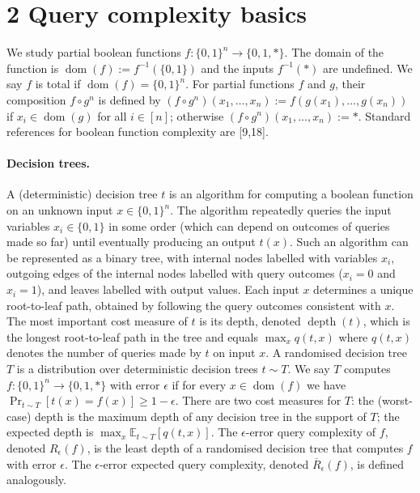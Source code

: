 \documentclass[10pt,a4paper]{article}
\begin{document}
\section*{2 Query complexity basics}
We study partial boolean functions $f:\{0,1\}^n\to\{0,1,*\}$. The domain of the function is $\operatorname{dom}(f):=f^{-1}(\{0,1\})$ and the inputs $f^{-1}(*)$ are undefined. We say $f$ is total if $\operatorname{dom}(f)=\{0,1\}^n$. For partial functions $f$ and $g$, their composition $f\circ g^n$ is defined by $(f\circ g^n)(x_1,\ldots,x_n):=f(g(x_1),\ldots,g(x_n))$ if $x_i\in\operatorname{dom}(g)$ for all $i\in[n]$; otherwise $(f\circ g^n)(x_1,\ldots,x_n):=*$. Standard references for boolean function complexity are [9,18].
\paragraph{Decision trees.} A (deterministic) decision tree $t$ is an algorithm for computing a boolean function on an unknown input $x\in\{0,1\}^n$. The algorithm repeatedly queries the input variables $x_i\in\{0,1\}$ in some order (which can depend on outcomes of queries made so far) until eventually producing an output $t(x)$. Such an algorithm can be represented as a binary tree, with internal nodes labelled with variables $x_i$, outgoing edges of the internal nodes labelled with query outcomes ($x_i=0$ and $x_i=1$), and leaves labelled with output values. Each input $x$ determines a unique root-to-leaf path, obtained by following the query outcomes consistent with $x$. The most important cost measure of $t$ is its depth, denoted $\operatorname{depth}(t)$, which is the longest root-to-leaf path in the tree and equals $\max_xq(t,x)$ where $q(t,x)$ denotes the number of queries made by $t$ on input $x$.
A randomised decision tree $T$ is a distribution over deterministic decision trees $t\sim T$. We say $T$ computes $f:\{0,1\}^n\to\{0,1,*\}$ with error $\epsilon$ if for every $x\in\operatorname{dom}(f)$ we have $\Pr_{t\sim T}[t(x)=f(x)]\ge1-\epsilon$. There are two cost measures for $T$: the (worst-case) depth is the maximum depth of any decision tree in the support of $T$; the expected depth is $\max_x\mathbb E_{t\sim T}[q(t,x)]$. The $\epsilon$-error query complexity of $f$, denoted $R_\epsilon(f)$, is the least depth of a randomised decision tree that computes $f$ with error $\epsilon$. The $\epsilon$-error expected query complexity, denoted $\overline R_\epsilon(f)$, is defined analogously.
\end{document}
